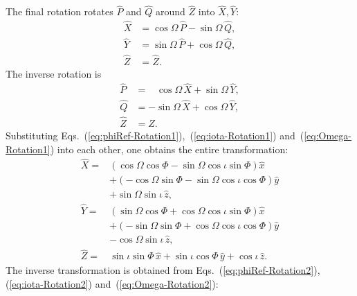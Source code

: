 \documentclass[11pt,tightenlines,article,amssymb,amsmath,amsfonts,superscriptaddress,nofootinbib]{revtex4}
\newcommand{\ExS}{{{\hat x}}}
\newcommand{\EyS}{{{\hat y}}}
\newcommand{\EzS}{{{\hat z}}}
\newcommand{\ExW}{\hat X}
\newcommand{\EyW}{\hat Y}
\newcommand{\EzW}{\hat Z}
\newcommand{\phiRef}{\Phi} %
\begin{document}
The final rotation rotates $\hat P$ and $\hat Q$
around $\EzW$ into $\ExW,\EyW$:
\begin{subequations}
  \label{eq:Omega-Rotation1}
\begin{align}
  \ExW&=\cos\Omega\,\hat P-\sin\Omega\,\hat Q,\\
  \EyW&=\sin\Omega\,\hat P+\cos\Omega\,\hat Q,\\
  \EzW&=\EzW.
\end{align}
\end{subequations}
The inverse rotation is
\begin{subequations}
  \label{eq:Omega-Rotation2}
\begin{align}
  \hat P&=\;\;\;\cos\Omega\,\ExW+\sin\Omega\,\EyW,\\
  \hat Q&=-\sin\Omega\,\ExW+\cos\Omega\,\EyW,\\
  \EzW&=\EzW.
\end{align}
\end{subequations}
Substituting Eqs.~(\ref{eq:phiRef-Rotation1}),~(\ref{eq:iota-Rotation1}) and~(\ref{eq:Omega-Rotation1}) into each other, one obtains the entire transformation:
\begin{subequations}
  \label{eq:Source-To-Wave}
  \begin{align}
    \ExW=& \left(\cos\Omega\cos\phiRef-\sin\Omega\cos\iota\sin\phiRef\right)\ExS
    \nonumber \\
    & + \left(-\cos\Omega\sin\phiRef-\sin\Omega\cos\iota\cos\phiRef\right)\EyS
    \nonumber\\
    & + \sin\Omega\sin\iota\,\EzS,\\
\EyW=& \left(\sin\Omega\cos\phiRef+\cos\Omega\cos\iota\sin\phiRef\right)\ExS
    \nonumber \\
    & + \left(-\sin\Omega\sin\phiRef+\cos\Omega\cos\iota\cos\phiRef\right)\EyS
    \nonumber\\
    & - \cos\Omega\sin\iota\,\EzS,\\
\label{eq:Z_from_z}
\EzW=&\sin\iota\sin\phiRef\,\ExS+\sin\iota\cos\phiRef\,\EyS + \cos\iota\,\EzS.
  \end{align}
  \end{subequations}
The inverse transformation is obtained from
Eqs.~(\ref{eq:phiRef-Rotation2}), (\ref{eq:iota-Rotation2})
and~(\ref{eq:Omega-Rotation2}):
\end{document}
